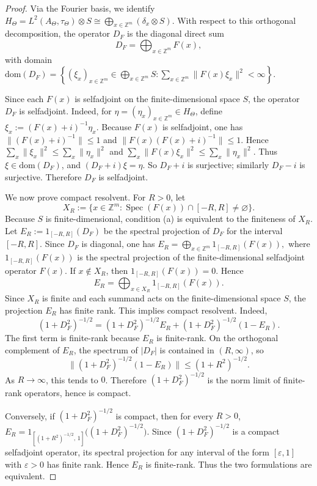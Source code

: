 \documentclass[11pt]{amsart}
\theoremstyle{definition}
\theoremstyle{remark}
\newcommand{\Z}{\mathbb{Z}}
\newcommand{\dom}{\mathrm{dom}}
\begin{document}
\begin{proof}
Via the Fourier basis, we identify $H_\Theta=L^2(A_\Theta,\tau_\Theta)\otimes S
\cong
\bigoplus_{x\in\Z^m} (\delta_x\otimes S).$
With respect to this orthogonal decomposition, the operator $D_F$ is the
diagonal direct sum
\[
D_F=\bigoplus_{x\in\Z^m} F(x),
\]
with domain $\dom(D_F)=
\left\{
(\xi_x)_{x\in\Z^m}\in \bigoplus_{x\in\Z^m}S :
\sum_{x\in\Z^m}\|F(x)\xi_x\|^2<\infty
\right\}.$

Since each $F(x)$ is selfadjoint on the finite-dimensional space $S$, the
operator $D_F$ is selfadjoint. Indeed, for $\eta=(\eta_x)_{x\in\Z^m}\in
H_\Theta$, define $\xi_x:=(F(x)+i)^{-1}\eta_x.$
Because \(F(x)\) is selfadjoint, one has
$\|(F(x)+i)^{-1}\|\leq 1$ and
$\|F(x)(F(x)+i)^{-1}\|\leq 1.$ Hence $\sum_x \|\xi_x\|^2\leq \sum_x \|\eta_x\|^2$ and $\sum_x \|F(x)\xi_x\|^2\leq \sum_x \|\eta_x\|^2.$
Thus \(\xi\in\dom(D_F)\), and $(D_F+i)\xi=\eta.$
So $D_F+i$ is surjective; similarly $D_F-i$ is surjective. Therefore
$D_F$ is selfadjoint.

We now prove compact resolvent. For $R>0$, let
\[
X_R:=\{x\in\Z^m:\operatorname{Spec}(F(x))\cap[-R,R]\neq\varnothing\}.
\]
Because $S$ is finite-dimensional, condition \textup{(a)} is equivalent to the
finiteness of $X_R$. Let $E_R:=1_{[-R,R]}(D_F)$
be the spectral projection of $D_F$ for the interval $[-R,R]$. Since $D_F$
is diagonal, one has $E_R
=
\bigoplus_{x\in\Z^m} 1_{[-R,R]}(F(x)),$
where $1_{[-R,R]}(F(x))$ is the spectral projection of the finite-dimensional
selfadjoint operator $F(x)$. If $x\notin X_R$, then $1_{[-R,R]}(F(x))=0.$
Hence
\[
E_R
=
\bigoplus_{x\in X_R} 1_{[-R,R]}(F(x)).
\]
Since $X_R$ is finite and each summand acts on the finite-dimensional space
$S$, the projection $E_R$ has finite rank. This implies compact resolvent. Indeed,
\[
(1+D_F^2)^{-1/2}
=
(1+D_F^2)^{-1/2}E_R
+
(1+D_F^2)^{-1/2}(1-E_R).
\]
The first term is finite-rank because $E_R$ is finite-rank. On the orthogonal
complement of $E_R$, the spectrum of $|D_F|$ is contained in $(R,\infty)$,
so
\[
\|(1+D_F^2)^{-1/2}(1-E_R)\|
\leq
(1+R^2)^{-1/2}.
\]
As $R\to\infty$, this tends to $0$. Therefore $(1+D_F^2)^{-1/2}$ is the
norm limit of finite-rank operators, hence is compact.

Conversely, if $(1+D_F^2)^{-1/2}$ is compact, then for every $R>0$,
$ E_R=1_{[(1+R^2)^{-1/2},\,1]}\bigl((1+D_F^2)^{-1/2}\bigr).$
Since $(1+D_F^2)^{-1/2}$ is a compact selfadjoint operator, its spectral
projection for any interval of the form $[\varepsilon,1]$ with $\varepsilon>0$
has finite rank. Hence $E_R$ is finite-rank. Thus the two formulations are
equivalent.


\end{proof}
\end{document}
